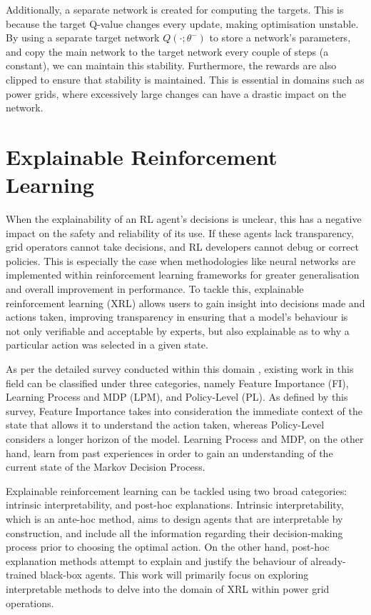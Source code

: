 Additionally, a separate network is created for computing the targets. This is because the target Q-value changes every update, making optimisation unstable. By using a separate target network $Q(\cdot;\theta^-)$ to store a network's parameters, and copy the main network to the target network every couple of steps (a constant), we can maintain this stability. Furthermore, the rewards are also clipped to ensure that stability is maintained. This is essential in domains such as power grids, where excessively large changes can have a drastic impact on the network.

\section{Explainable Reinforcement Learning}

When the explainability of an RL agent's decisions is unclear, this has a negative impact on the safety and reliability of its use. If these agents lack transparency, grid operators cannot take decisions, and RL developers cannot debug or correct policies. This is especially the case when methodologies like neural networks are implemented within reinforcement learning frameworks for greater generalisation and overall improvement in performance. To tackle this, explainable reinforcement learning (XRL) allows users to gain insight into decisions made and actions taken, improving transparency in ensuring that a model's behaviour is not only verifiable and acceptable by experts, but also explainable as to why a particular action was selected in a given state.

As per the detailed survey conducted within this domain \cite{milani2022survey}, existing work in this field can be classified under three categories, namely Feature Importance (FI), Learning Process and MDP (LPM), and Policy-Level (PL). As defined by this survey, Feature Importance takes into consideration the immediate context of the state that allows it to understand the action taken, whereas Policy-Level considers a longer horizon of the model. Learning Process and MDP, on the other hand, learn from past experiences in order to gain an understanding of the current state of the Markov Decision Process. 

Explainable reinforcement learning can be tackled using two broad categories: intrinsic interpretability, and post-hoc explanations. Intrinsic interpretability, which is an ante-hoc method, aims to design agents that are interpretable by construction, and include all the information regarding their decision-making process prior to choosing the optimal action. On the other hand, post-hoc explanation methods attempt to explain and justify the behaviour of already-trained black-box agents. This work will primarily focus on exploring interpretable methods to delve into the domain of XRL within power grid operations.

